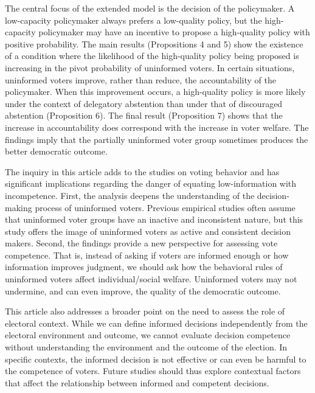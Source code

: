 \documentclass[doc,natbib,12pt]{apa6}
\begin{document}
	\par The central focus of the extended model is the decision of the policymaker. A low-capacity policymaker always prefers a low-quality policy, but the high-capacity policymaker may have an incentive to propose a high-quality policy with positive probability. The main results (Propositions 4 and 5) show the existence of a condition where the likelihood of the high-quality policy being proposed is increasing in the pivot probability of uninformed voters. In certain situations, uninformed voters improve, rather than reduce, the accountability of the policymaker. When this improvement occurs, a high-quality policy is more likely under the context of delegatory abstention than under that of discouraged abstention (Proposition 6). The final result (Proposition 7) shows that the increase in accountability does correspond with the increase in voter welfare. The findings imply that the partially uninformed voter group sometimes produces the better democratic outcome.
	
	\par The inquiry in this article adds to the studies on voting behavior and has significant implications regarding the danger of equating low-information with incompetence. First, the analysis deepens the understanding of the decision-making process of uninformed voters. Previous empirical studies often assume that uninformed voter groups have an inactive and inconsistent nature, but this study offers the image of uninformed voters as active and consistent decision makers. Second, the findings provide a new perspective for assessing vote competence. That is, instead of asking if voters are informed enough or how information improves judgment, we should ask how the behavioral rules of uninformed voters affect individual/social welfare. Uninformed voters may not undermine, and can even improve, the quality of the democratic outcome.
	
	\par This article also addresses a broader point on the need to assess the role of electoral context. While we can define informed decisions independently from the electoral environment and outcome, we cannot evaluate decision competence without understanding the environment and the outcome of the election. In specific contexts, the informed decision is not effective or can even be harmful to the competence of voters. Future studies should thus explore contextual factors that affect the relationship between informed and competent decisions.
	
\end{document}
